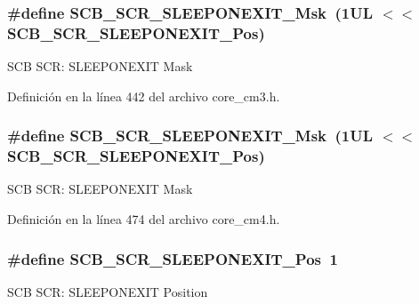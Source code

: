 \subsubsection[{\texorpdfstring{S\+C\+B\+\_\+\+S\+C\+R\+\_\+\+S\+L\+E\+E\+P\+O\+N\+E\+X\+I\+T\+\_\+\+Msk}{SCB_SCR_SLEEPONEXIT_Msk}}]{\setlength{\rightskip}{0pt plus 5cm}\#define S\+C\+B\+\_\+\+S\+C\+R\+\_\+\+S\+L\+E\+E\+P\+O\+N\+E\+X\+I\+T\+\_\+\+Msk~(1\+U\+L $<$$<$ S\+C\+B\+\_\+\+S\+C\+R\+\_\+\+S\+L\+E\+E\+P\+O\+N\+E\+X\+I\+T\+\_\+\+Pos)}\hypertarget{group___c_m_s_i_s___s_c_b_ga50a243e317b9a70781b02758d45b05ee}{}\label{group___c_m_s_i_s___s_c_b_ga50a243e317b9a70781b02758d45b05ee}
S\+CB S\+CR\+: S\+L\+E\+E\+P\+O\+N\+E\+X\+IT Mask 

Definición en la línea 442 del archivo core\+\_\+cm3.\+h.

\subsubsection[{\texorpdfstring{S\+C\+B\+\_\+\+S\+C\+R\+\_\+\+S\+L\+E\+E\+P\+O\+N\+E\+X\+I\+T\+\_\+\+Msk}{SCB_SCR_SLEEPONEXIT_Msk}}]{\setlength{\rightskip}{0pt plus 5cm}\#define S\+C\+B\+\_\+\+S\+C\+R\+\_\+\+S\+L\+E\+E\+P\+O\+N\+E\+X\+I\+T\+\_\+\+Msk~(1\+U\+L $<$$<$ S\+C\+B\+\_\+\+S\+C\+R\+\_\+\+S\+L\+E\+E\+P\+O\+N\+E\+X\+I\+T\+\_\+\+Pos)}\hypertarget{group___c_m_s_i_s___s_c_b_ga50a243e317b9a70781b02758d45b05ee}{}\label{group___c_m_s_i_s___s_c_b_ga50a243e317b9a70781b02758d45b05ee}
S\+CB S\+CR\+: S\+L\+E\+E\+P\+O\+N\+E\+X\+IT Mask 

Definición en la línea 474 del archivo core\+\_\+cm4.\+h.

\subsubsection[{\texorpdfstring{S\+C\+B\+\_\+\+S\+C\+R\+\_\+\+S\+L\+E\+E\+P\+O\+N\+E\+X\+I\+T\+\_\+\+Pos}{SCB_SCR_SLEEPONEXIT_Pos}}]{\setlength{\rightskip}{0pt plus 5cm}\#define S\+C\+B\+\_\+\+S\+C\+R\+\_\+\+S\+L\+E\+E\+P\+O\+N\+E\+X\+I\+T\+\_\+\+Pos~1}\hypertarget{group___c_m_s_i_s___s_c_b_ga3680a15114d7fdc1e25043b881308fe9}{}\label{group___c_m_s_i_s___s_c_b_ga3680a15114d7fdc1e25043b881308fe9}
S\+CB S\+CR\+: S\+L\+E\+E\+P\+O\+N\+E\+X\+IT Position 

